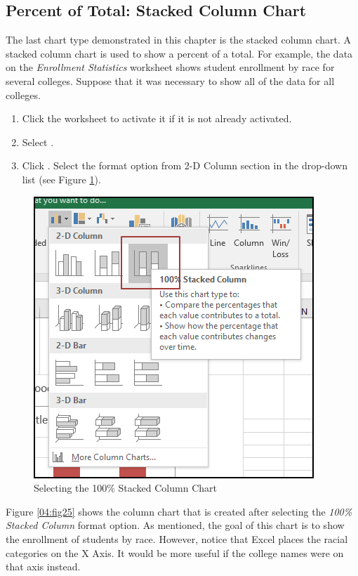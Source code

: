 \subsection{Percent of Total: Stacked Column Chart}

The last chart type demonstrated in this chapter is the stacked column chart. A stacked column chart is used  to show a percent of a total. For example, the data on the \textit{Enrollment Statistics} worksheet shows student enrollment by race for several colleges. Suppose that it was necessary to show all of the data for all colleges.

\begin{enumerate}
	\item Click the  worksheet to activate it if it is not already activated.
	\item Select .
	\item Click .	Select the  format option from 2-D Column section in the drop-down list (see Figure \ref{04:fig24}).
\end{enumerate}

\begin{figure}[H]
	\centering
	\includegraphics[width=\maxwidth{.65\linewidth}]{gfx/ch04_fig24}
	\caption{Selecting the 100\% Stacked Column Chart}
	\label{04:fig24}
\end{figure}

Figure \ref{04:fig25} shows the column chart that is created after selecting the \textit{100\% Stacked Column} format option. As mentioned, the goal of this chart is to show the enrollment of students by race. However, notice that Excel places the racial categories on the X Axis. It would be more useful if the college names were on that axis instead.

